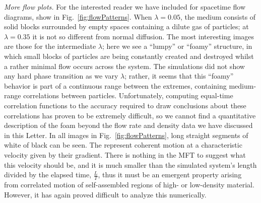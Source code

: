 \documentclass[
reprint,
 amsmath,amssymb,
 aps,
 prl,
]{revtex4-1}
\begin{document}
\textit{More flow plots.} For the interested reader we have included for spacetime flow diagrams, show in Fig.~\ref{fig:flowPatterns}. When $\lambda=0.05$, the medium consists of solid blocks surrounded by empty spaces containing a dilute
gas of particles; at $\lambda=0.35$ it is not so different from normal diffusion.
The most interesting images are those for the intermediate $\lambda$; here we see a ``lumpy'' or ``foamy'' structure, in which small blocks
of particles are being constantly created and destroyed whilst a rather minimal flow occurs across the system.
The simulations did not show any hard phase transition as we vary $\lambda$; rather, it seems that this ``foamy''
behavior is part of a continuous range between the extremes, containing medium-range correlations between particles.
Unfortunately, computing equal-time correlation functions to the accuracy required
to draw conclusions about these correlations has proven to be extremely difficult, so we cannot find a quantitative description of the foam beyond the flow rate and density data we have discussed in this Letter.
In all images in Fig.~\ref{fig:flowPatterns}, long straight segments of white of black can be seen.  The represent coherent motion at a characteristic velocity given by their gradient. There is nothing in the MFT to suggest what this velocity
should be, and it is much smaller than the simulated system's length divided by the elapsed time,  $\frac{L}{T}$, thus it must be an emergent property arising from correlated motion of self-assembled regions of  high- or low-density material.
However, it has again proved difficult to analyze this numerically.
\end{document}
